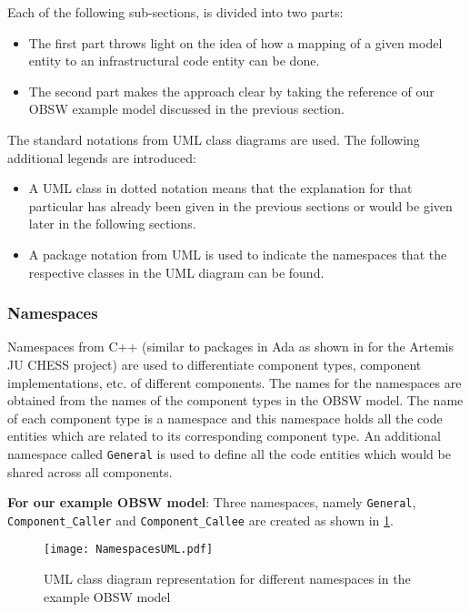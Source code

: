 Each of the following sub-sections, is divided into two parts:
\begin{itemize}
\item The first part throws light on the idea of how a mapping of a given model entity to an infrastructural code entity can be done.
\item The second part makes the approach clear by taking the reference of our OBSW example model discussed in the previous section. 
\end{itemize}

The standard notations from UML class diagrams are used. The following additional legends are introduced:
\begin{itemize}
\item A UML class in dotted notation means that the explanation for that particular has already been given in the previous sections or would be given later in the following sections. 
\item A package notation from UML is used to indicate the namespaces that the respective classes in the UML diagram can be found.
\end{itemize}  

\subsubsection{\textbf{Namespaces}}
Namespaces from C++ (similar to packages in Ada as shown in \cite{EvoRAVCodeAr} for the Artemis JU CHESS project) are used to differentiate component types, component implementations, etc. of different components. The names for the namespaces are obtained from the names of the component types in the OBSW model. The name of each component type is a namespace and this namespace holds all the code entities which are related to its corresponding component type. An additional namespace called \texttt{General} is used to define all the code entities which would be shared across all components.   

\textbf{For our example OBSW model}: Three namespaces, namely \texttt{General}, \texttt{Component\_Caller} and \texttt{Component\_Callee} are created as shown in \cref{fig: PackagesUML}.

\begin{figure}[h]
	\centering
	\texttt{[image: NamespacesUML.pdf]}
	\caption{UML class diagram representation for different namespaces in the example OBSW model}
	\label{fig: PackagesUML}
\end{figure}

